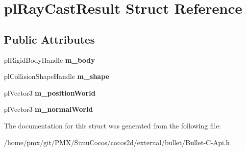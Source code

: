 \hypertarget{structplRayCastResult}{}\section{pl\+Ray\+Cast\+Result Struct Reference}
\label{structplRayCastResult}
\subsection*{Public Attributes}
\begin{DoxyCompactItemize}
\item 
\mbox{\label{structplRayCastResult_a12aec084f7d4f4cd5869055c6d841283}} 
pl\+Rigid\+Body\+Handle {\bfseries m\+\_\+body}
\item 
\mbox{\label{structplRayCastResult_a4639ab5e2c00ae360e9453d63a7b8045}} 
pl\+Collision\+Shape\+Handle {\bfseries m\+\_\+shape}
\item 
\mbox{\label{structplRayCastResult_ade485e5e5fb6e890527e381b14ace099}} 
pl\+Vector3 {\bfseries m\+\_\+position\+World}
\item 
\mbox{\label{structplRayCastResult_a16f21e8e263d31cbdec7fbc9bc11b38b}} 
pl\+Vector3 {\bfseries m\+\_\+normal\+World}
\end{DoxyCompactItemize}


The documentation for this struct was generated from the following file\+:\begin{DoxyCompactItemize}
\item 
/home/pmx/git/\+P\+M\+X/\+Simu\+Cocos/cocos2d/external/bullet/Bullet-\/\+C-\/\+Api.\+h\end{DoxyCompactItemize}
